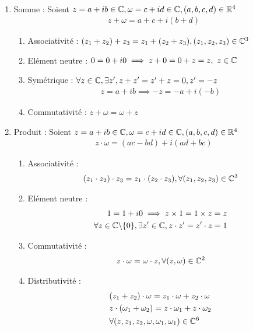     \begin{graybox}
    \begin{proposition}~
\begin{enumerate}
\item Somme : Soient $z = a + ib \in \mathbb{C}, \omega = c + id \in \mathbb{C}, (a, b, c, d) \in \mathbb{R}^4$
\begin{align*}
    z + \omega = a + c + i (b + d)
\end{align*}

\begin{enumerate}
    \item Associativité : $(z_1 + z_2) + z_3 = z_1 + (z_2 + z_3), (z_1, z_2, z_3) \in \mathbb{C}^3$
    \item Elément neutre : $0 = 0 + i0 \implies z + 0 = 0 + z = z,\ z \in \mathbb{C}$
\item Symétrique : $\forall z \in \mathbb{C}, \exists z', z + z' = z' + z = 0, z' = -z$
\begin{align*}
    z = a + ib \implies -z = -a + i(-b)
\end{align*}
\item Commutativité : $z + \omega = \omega + z$
\end{enumerate}

\item Produit : Soient $z = a + ib \in \mathbb{C}, \omega = c + id \in \mathbb{C}, (a, b, c, d) \in \mathbb{R}^4$
\begin{align*}
    z \cdot \omega = (ac - bd) + i(ad + bc)
\end{align*}

\begin{enumerate}
    \item Associativité :
    \begin{align*}
        (z_1 \cdot z_2) \cdot z_3 = z_1 \cdot (z_2 \cdot z_3), \forall (z_1, z_2, z_3) \in \mathbb{C}^3 
    \end{align*}
    \item Elément neutre :
        \begin{align*}
            1 = 1 + i0 \implies z \times 1 = 1 \times z = z \\
            \forall z \in \mathbb{C} \backslash \{0\}, \exists z' \in \mathbb{C}, z \cdot z' = z' \cdot z =1 
        \end{align*}
    \item Commutativité :
        \begin{align*}
            z \cdot \omega = \omega \cdot z, \forall (z, \omega) \in \mathbb{C}^2 
        \end{align*}
    \item Distributivité :
        \begin{align*}
        &(z_1 + z_2) \cdot \omega = z_1 \cdot \omega + z_2 \cdot \omega \\
        &z \cdot (\omega_1 + \omega_2) = z \cdot \omega_1 + z \cdot \omega_2 \\
        &\forall (z, z_1, z_2, \omega, \omega_1, \omega_1) \in \mathbb{C}^6
        \end{align*}
\end{enumerate}


\end{enumerate}
\end{proposition}
\end{graybox}
